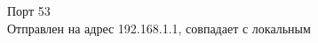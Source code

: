 \documentclass[a4paper,11pt]{article}
\begin{document}
\begin{center}
\label{fig:image}
\end{center}
\begin{center}
\label{fig:image}
\end{center}

Порт 53 \\
Отправлен на адрес 192.168.1.1, совпадает с локальным 

\begin{center}
\label{fig:image}
\end{center}
\end{document}
